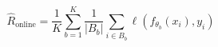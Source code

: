 \[
\widehat{R}_{\mathrm{online}}=\frac{1}{K}\sum_{b=1}^{K}\frac{1}{|B_b|}\sum_{i\in B_b}\ell(f_{\theta_b}(x_i),y_i)
\]
